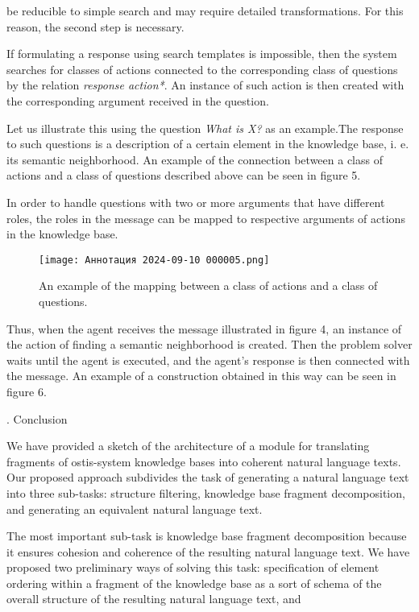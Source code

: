 \documentclass[twocolumn]{scndocument}
\newcommand{\RNumb}[1]{\uppercase\expandafter{\romannumeral #1\relax}}
\begin{document}
be reducible to simple search and may require detailed
transformations. For this reason, the second step is necessary.
\par If formulating a response using search templates is impossible, then the system searches for classes of actions
connected to the corresponding class of questions by the
relation \textit{response action*}. An instance of such action is
then created with the corresponding argument received
in the question.
\par Let us illustrate this using the question \textit{What is X?} as an example.The response to such questions is a
description of a certain element in the knowledge base,
i. e. its semantic neighborhood. An example of the
connection between a class of actions and a class of
questions described above can be seen in figure 5.
\par In order to handle questions with two or more arguments that have different roles, the roles in the message
can be mapped to respective arguments of actions in the
knowledge base.
\begin{figure}[H]
  \texttt{[image: Аннотация 2024-09-10 000005.png]}
  \caption{An example of the mapping between a class of actions and
a class of questions.}
\end{figure}
\par \vspace{0.5mm} Thus, when the agent receives the message illustrated
in figure 4, an instance of the action of finding a semantic
neighborhood is created. Then the problem solver waits
until the agent is executed, and the agent’s response
is then connected with the message. An example of a
construction obtained in this way can be seen in figure 6.
\begin{center}
   \RNumb{5}. Conclusion
\end{center}\vspace{0.8mm}
\par We have provided a sketch of the architecture of a
module for translating fragments of ostis-system knowledge bases into coherent natural language texts. Our
proposed approach subdivides the task of generating
a natural language text into three sub-tasks: structure
filtering, knowledge base fragment decomposition, and
generating an equivalent natural language text.
\par The most important sub-task is knowledge base fragment decomposition because it ensures cohesion and
coherence of the resulting natural language text. We
have proposed two preliminary ways of solving this task:
specification of element ordering within a fragment of
the knowledge base as a sort of schema of the overall
structure of the resulting natural language text, and
\end{document}
